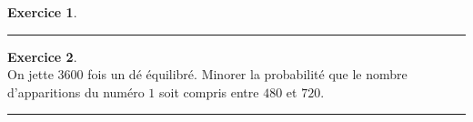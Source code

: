 \documentclass[a4paper,10pt]{article}
\theoremstyle{definition}
\theoremstyle{definition}
\newtheorem{exo}{Exercice}
\begin{document}
\begin{minipage}{1\linewidth}
\begin{minipage}[t]{0.48\linewidth}
\begin{exo}
		\centering
		\rule{1\linewidth}{0.6pt}
	\end{exo}	

	\begin{exo}\quad\\[0.2cm]
	On jette $3600$ fois un dé équilibré. Minorer la probabilité que le nombre d'apparitions du numéro $1$ soit compris entre $480$ et $720$.
	
	\centering
	\rule{1\linewidth}{0.6pt}
\end{exo}
		
			
		
		
	\end{minipage}
\end{minipage}	
\end{document}
